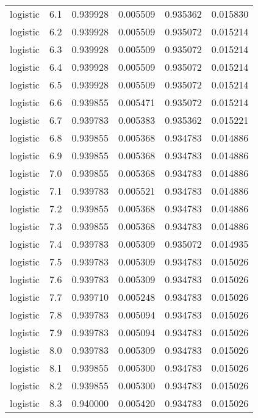 \begin{tabular}{lrrrrr}
logistic &        6.1 &    0.939928 &   0.005509 &   0.935362 &  0.015830 \\
logistic &        6.2 &    0.939928 &   0.005509 &   0.935072 &  0.015214 \\
logistic &        6.3 &    0.939928 &   0.005509 &   0.935072 &  0.015214 \\
logistic &        6.4 &    0.939928 &   0.005509 &   0.935072 &  0.015214 \\
logistic &        6.5 &    0.939928 &   0.005509 &   0.935072 &  0.015214 \\
logistic &        6.6 &    0.939855 &   0.005471 &   0.935072 &  0.015214 \\
logistic &        6.7 &    0.939783 &   0.005383 &   0.935362 &  0.015221 \\
logistic &        6.8 &    0.939855 &   0.005368 &   0.934783 &  0.014886 \\
logistic &        6.9 &    0.939855 &   0.005368 &   0.934783 &  0.014886 \\
logistic &        7.0 &    0.939855 &   0.005368 &   0.934783 &  0.014886 \\
logistic &        7.1 &    0.939783 &   0.005521 &   0.934783 &  0.014886 \\
logistic &        7.2 &    0.939855 &   0.005368 &   0.934783 &  0.014886 \\
logistic &        7.3 &    0.939855 &   0.005368 &   0.934783 &  0.014886 \\
logistic &        7.4 &    0.939783 &   0.005309 &   0.935072 &  0.014935 \\
logistic &        7.5 &    0.939783 &   0.005309 &   0.934783 &  0.015026 \\
logistic &        7.6 &    0.939783 &   0.005309 &   0.934783 &  0.015026 \\
logistic &        7.7 &    0.939710 &   0.005248 &   0.934783 &  0.015026 \\
logistic &        7.8 &    0.939783 &   0.005094 &   0.934783 &  0.015026 \\
logistic &        7.9 &    0.939783 &   0.005094 &   0.934783 &  0.015026 \\
logistic &        8.0 &    0.939783 &   0.005309 &   0.934783 &  0.015026 \\
logistic &        8.1 &    0.939855 &   0.005300 &   0.934783 &  0.015026 \\
logistic &        8.2 &    0.939855 &   0.005300 &   0.934783 &  0.015026 \\
logistic &        8.3 &    0.940000 &   0.005420 &   0.934783 &  0.015026 \\

\end{tabular}
